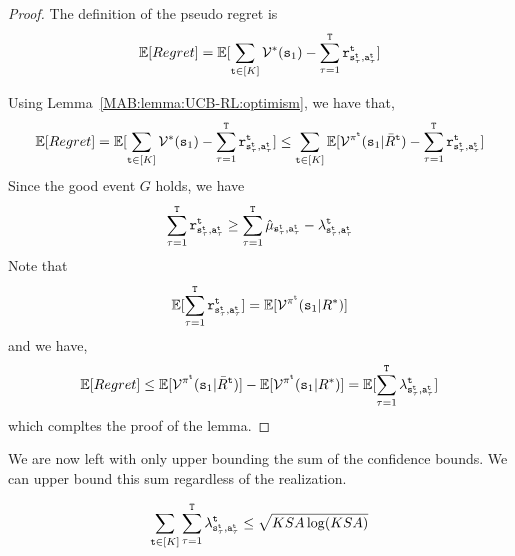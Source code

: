 \begin{proof}
    The definition of the pseudo regret is
    \[
    \mathbb{E}[Regret]= \mathbb{E}[\sum_{{\tt t}\in [K]} \mathcal{V}^*({\tt s}_1)-\sum_{\tau=1}^{\tt T} {\tt r}^{\tt t}_{{\tt s}_\tau^{\tt t},{\tt a}_\tau^{\tt t}}]
    \]

Using Lemma~\ref{MAB:lemma:UCB-RL:optimism}, we have that,
    \[
    \mathbb{E}[Regret]= \mathbb{E}[\sum_{{\tt t}\in [K]} \mathcal{V}^*({\tt s}_1)-\sum_{\tau=1}^{\tt T} {\tt r}^{\tt t}_{{\tt s}_\tau^{\tt t},{\tt a}_\tau^{\tt t}}]
    \leq
    \sum_{{\tt t}\in [K]}
    \mathbb{E}[\mathcal{V}^{\pi^{\tt t}}({\tt s}_1|\bar{R}^{\tt t})
    -\sum_{\tau=1}^{\tt T} {\tt r}^{\tt t}_{{\tt s}_\tau^{\tt t},{\tt a}_\tau^{\tt t}}]
    \]
Since the good event $G$ holds, we have 
\[
\sum_{\tau=1}^{\tt T} {\tt r}^{\tt t}_{{\tt s}_\tau^{\tt t},{\tt a}_\tau^{\tt t}} \geq \sum_{\tau=1}^{\tt T}
 \hat{\mu}_{{\tt s}_\tau^{\tt t},{\tt a}_\tau^{\tt t}}-\lambda^{\tt t}_{{\tt s}_\tau^{\tt t},{\tt a}_\tau^{\tt t}}
\]
Note that
\[
\mathbb{E}[\sum_{\tau=1}^{\tt T} {\tt r}^{\tt t}_{{\tt s}_\tau^{\tt t},{\tt a}_\tau^{\tt t}} ] =\mathbb{E}[\mathcal{V}^{\pi^{\tt t}}({\tt s}_1|R^*)]
\]
and we have,
\[
\mathbb{E}[Regret]\leq \mathbb{E}[\mathcal{V}^{\pi^{\tt t}}({\tt s}_1|\bar{R}^{\tt t})] -
\mathbb{E}[\mathcal{V}^{\pi^{\tt t}}({\tt s}_1|R^*)]=
\mathbb{E}[\sum_{\tau=1}^{\tt T} \lambda^{\tt t}_{{\tt s}_\tau^{\tt t},{\tt a}_\tau^{\tt t}} ]
\]
which compltes the proof of the lemma.
\end{proof}

We are now left with only upper bounding the sum of the confidence bounds.
We can upper bound this sum regardless of the realization. 

\begin{lemma}
    \[
    \sum_{{\tt t}\in [K]} \sum_{\tau=1}^{\tt T}
\lambda^{\tt t}_{{\tt s}_\tau^{\tt t},{\tt a}_\tau^{\tt t}}
    \leq \sqrt{KSA\log (KSA)}
    \]
\end{lemma}

